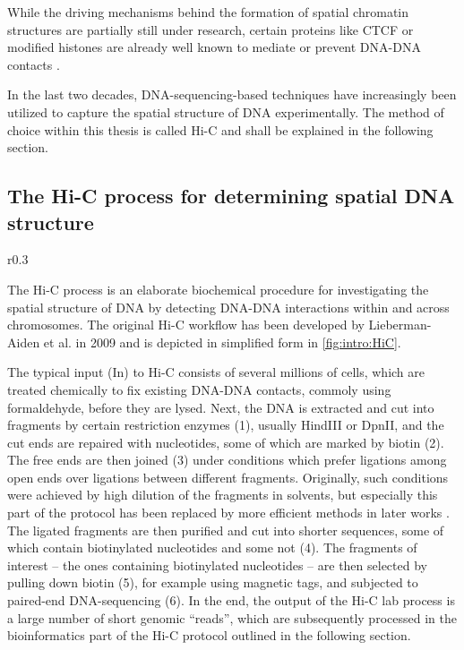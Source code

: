 While the driving mechanisms behind the formation of spatial chromatin structures are partially still under research,
certain proteins like CTCF or modified histones are already well known to mediate or prevent DNA-DNA contacts \cite{Phillips2009,PhillipsCremins2013,Dixon2015}.

In the last two decades, DNA-sequencing-based techniques have increasingly been utilized to capture the spatial structure of DNA experimentally.
The method of choice within this thesis is called Hi-C and shall be explained in the following section.

\subsection{The Hi-C process for determining spatial DNA structure} \label{sec:intro:hic}
\begin{wrapfigure}[34]{r}{0.3\textwidth}
 \vspace{-7mm}
 \caption{Hi-C lab process}
 \label{fig:intro:HiC}
\end{wrapfigure}
The Hi-C process is an elaborate biochemical procedure for investigating the 
spatial structure of DNA by detecting DNA-DNA interactions within and 
across chromosomes.
The original Hi-C workflow has been developed by Lieberman-Aiden et al. in 2009  \cite{LiebermanAiden2009}
and is depicted in simplified form in \cref{fig:intro:HiC}.

The typical input (In) to Hi-C consists of several millions of cells,
which are treated chemically to fix existing DNA-DNA contacts, 
commoly using formaldehyde, before they are lysed.
Next, the DNA is extracted and cut into fragments by certain restriction enzymes (1),
usually HindIII or DpnII, 
and the cut ends are repaired with nucleotides, some of which are marked by biotin (2).
The free ends are then joined (3) under conditions which prefer
ligations among open ends over ligations between different fragments.
Originally, such conditions were achieved by high dilution of the fragments in
solvents, but especially this part of the protocol has been replaced by 
more efficient methods in later works \cite{Rao2014,Belaghzal2017}.
The ligated fragments are then purified and cut into shorter sequences,
some of which contain biotinylated nucleotides and some not (4).
The fragments of interest -- the ones containing biotinylated nucleotides -- 
are then selected by pulling down biotin (5), for example using magnetic tags,  
and subjected to paired-end DNA-sequencing (6).
In the end, the output of the Hi-C lab process is a large number of short genomic ``reads'',
which are subsequently processed in the bioinformatics part of the Hi-C protocol 
outlined in the following section.

